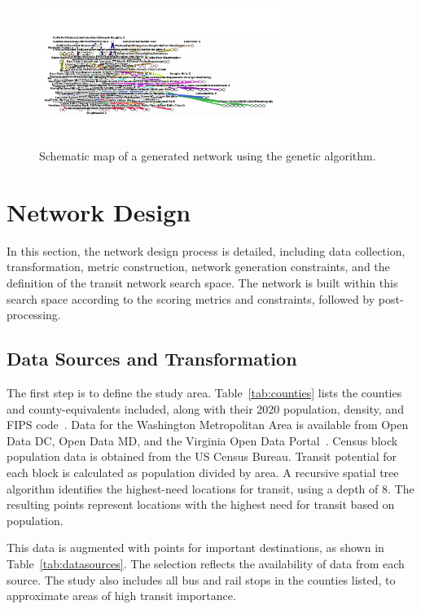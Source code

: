 \documentclass[manuscript,nonacm]{acmart}
\begin{document}
\begin{figure}[h]
    \centering
    \includegraphics[width=0.7\textwidth]{img/lines_genetic.png}
    \caption{Schematic map of a generated network using the genetic algorithm.}
    \label{fig:schematic}
\end{figure}

\section{Network Design}

In this section, the network design process is detailed, including data collection, transformation, metric construction, network generation constraints, and the definition of the transit network search space. The network is built within this search space according to the scoring metrics and constraints, followed by post-processing.

\subsection{Data Sources and Transformation}
The first step is to define the study area. Table~\ref{tab:counties} lists the counties and county-equivalents included, along with their 2020 population, density, and FIPS code~\cite{lit:census}. Data for the Washington Metropolitan Area is available from Open Data DC, Open Data MD, and the Virginia Open Data Portal~\cite{lit:opendata}. Census block population data is obtained from the US Census Bureau. Transit potential for each block is calculated as population divided by area. A recursive spatial tree algorithm identifies the highest-need locations for transit, using a depth of 8. The resulting points represent locations with the highest need for transit based on population.

This data is augmented with points for important destinations, as shown in Table~\ref{tab:datasources}. The selection reflects the availability of data from each source. The study also includes all bus and rail stops in the counties listed, to approximate areas of high transit importance.
\end{document}
